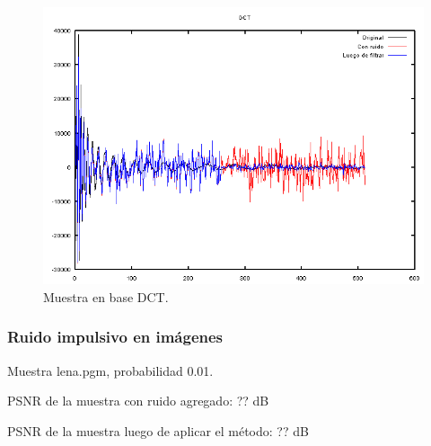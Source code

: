 \documentclass[a4paper,10pt,twoside]{article}
\begin{document}
\begin{figure}[H]
  \centering
  \includegraphics[width=15cm]{graficos/dopp_impulsivo_atenuar_dct.png} 
  \caption{Muestra en base DCT.}
\end{figure}


\subsubsection{Ruido impulsivo en imágenes}

Muestra lena.pgm, probabilidad 0.01.

PSNR de la muestra con ruido agregado: ?? dB

PSNR de la muestra luego de aplicar el método: ?? dB
\end{document}
